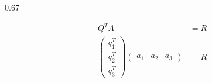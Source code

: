 \begin{frame}
\begin{columns}
\begin{column}{0.67\textwidth}
\begin{exampleblock}{}
      \end{exampleblock}
      \begin{exampleblock}{}
        \begin{align}
          Q^{T}A&=R \\
          \begin{pmatrix}
            q_1^T \\ q_2^T \\ q_3^T
          \end{pmatrix}
          \begin{pmatrix}
            a_1 & a_2 & a_3
          \end{pmatrix}
          &=R
        \end{align}
      \end{exampleblock}
    \end{column}
  \end{columns}
\end{frame}


